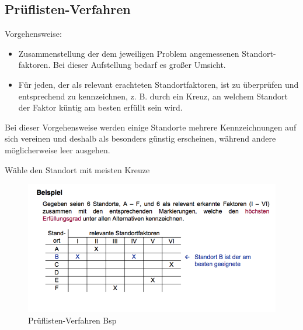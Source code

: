     \subsection{Prüflisten-Verfahren} %
    \label{sub:pr_flisten_verfahren}

      \par Vorgehensweise:

      \begin{itemize}
        \item Zusammenstellung der dem jeweiligen Problem angemessenen Standort-
faktoren. Bei dieser Aufstellung bedarf es großer Umsicht.
        \item Für jeden, der als relevant erachteten Standortfaktoren, ist zu überprüfen und entsprechend zu kennzeichnen, z. B. durch ein Kreuz, an welchem Standort der Faktor küntig am besten erfüllt sein wird.
      \end{itemize}

      \par Bei dieser Vorgehensweise werden einige Standorte mehrere Kennzeichnungen auf sich vereinen und deshalb als besonders günstig erscheinen, während andere möglicherweise leer ausgehen.

      \begin{note}\label{rem:Prüflisten-Verfahren}
        Wähle den Standort mit meisten Kreuze
      \end{note}

      \begin{exmp}
        
      \end{exmp}

      \begin{figure}[htbp]
        \centering
        \includegraphics[width=\textwidth]{Images/Prueflisten_Verfahren_BSP.png}
        \caption{Prüflisten-Verfahren Bsp}
      \end{figure}
    
